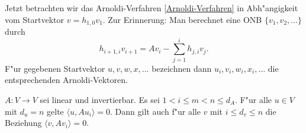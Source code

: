 Jetzt betrachten wir das Arnoldi-Verfahren \ref{Arnoldi-Verfahren} in
Abh"angigkeit vom Startvektor $v = h_{1,0}v_1 $. Zur Erinnerung: Man berechnet
eine ONB $\{v_1,v_2,\ldots\}$ durch
\begin{equation} \label{Arnoldi_rek.eq}
h_{i+1,i} v_{i+1} = Av_i - \sum_{j=1}^{i} h_{j,i}v_j.
\end{equation}
F"ur gegebenen Startvektor $u,v,w,x,\ldots$ bezeichnen dann $u_i,v_i,w_i,x_i, \ldots$
die entsprechenden Arnoldi-Vektoren. 

\begin{lem} \label{FMproof2:lem}
$A: V \to V$ sei linear und invertierbar. Es sei $1 < i \leq m < n \leq d_A$.
F"ur alle $u \in V$ mit $d_u = n$ gelte $\langle u, Au_i \rangle =0$. Dann gilt
auch f"ur alle $v$ mit $i \leq d_v \leq n$ die Beziehung $\langle v, Av_i \rangle = 0$.
\end{lem}
